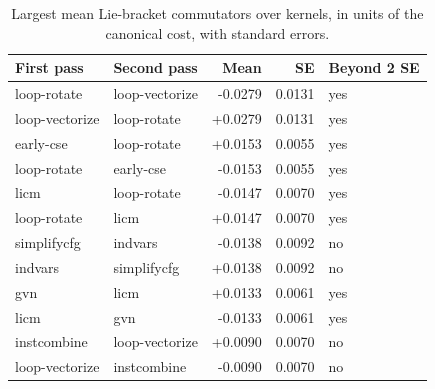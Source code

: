 \begin{table}[t]
\centering
\caption{Largest mean Lie-bracket commutators over kernels, in units of the canonical cost, with standard errors.}
\label{tab:lie}
\setlength{\tabcolsep}{3pt}
\begin{tabular}{|l|l|r|r|l|}
\hline
First pass & Second pass & Mean & SE & Beyond 2 SE \\
\hline
loop-rotate & loop-vectorize & -0.0279 & 0.0131 & yes \\
\hline
loop-vectorize & loop-rotate & +0.0279 & 0.0131 & yes \\
\hline
early-cse & loop-rotate & +0.0153 & 0.0055 & yes \\
\hline
loop-rotate & early-cse & -0.0153 & 0.0055 & yes \\
\hline
licm & loop-rotate & -0.0147 & 0.0070 & yes \\
\hline
loop-rotate & licm & +0.0147 & 0.0070 & yes \\
\hline
simplifycfg & indvars & -0.0138 & 0.0092 & no \\
\hline
indvars & simplifycfg & +0.0138 & 0.0092 & no \\
\hline
gvn & licm & +0.0133 & 0.0061 & yes \\
\hline
licm & gvn & -0.0133 & 0.0061 & yes \\
\hline
instcombine & loop-vectorize & +0.0090 & 0.0070 & no \\
\hline
loop-vectorize & instcombine & -0.0090 & 0.0070 & no \\
\hline
\end{tabular}
\end{table}
